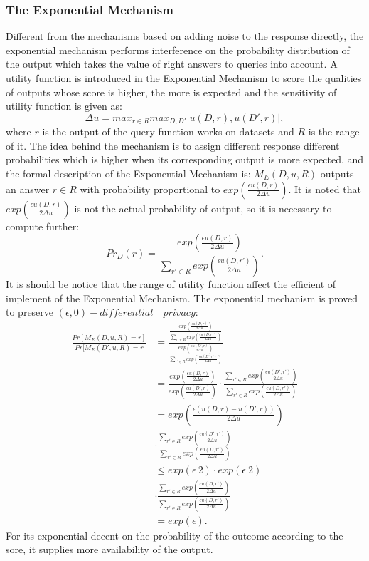 \documentclass[conference]{IEEEtran}
\begin{document}
\subsubsection{The Exponential Mechanism}
Different from the mechanisms based on adding noise to the response directly, the exponential mechanism performs interference on the probability distribution of the output which takes the value of right answers to queries into account. A utility function is introduced in the Exponential Mechanism to score the qualities of outputs whose score is higher, the more is expected and the sensitivity of utility function is given as:
\begin{equation}
    \Delta u = max_{r \in R} max_{D, D'}|u(D, r), u(D', r)|,
\end{equation}
where $r$ is the output of the query function works on datasets and $R$ is the range of it. The idea behind the mechanism is to assign different response different probabilities which is higher when its corresponding output is more expected, and the formal description of the Exponential Mechanism is: $M_E(D, u, R)$ outputs an answer $r \in R$ with probability proportional to $exp(\frac{\epsilon u(D,r)}{2\Delta u})$. It is noted that $exp(\frac{\epsilon u(D,r)}{2\Delta u})$ is not the actual probability of output, so it is necessary to compute further:
\begin{equation}
    Pr_D(r) = \frac{exp(\frac{\epsilon u(D,r)}{2\Delta u})}{\sum_{r' \in R}exp(\frac{\epsilon u(D,r')}{2\Delta u})}.
\end{equation}
It is should be notice that the range of utility function affect the efficient of implement of the Exponential Mechanism. The exponential mechanism is proved to preserve $(\epsilon, 0)-differential\quad privacy$:
\begin{equation}
    \begin{split}
        \frac{Pr[M_E(D, u, R) = r]}{Pr[M_E(D', u, R) = r} &= \frac{\frac{exp(\frac{\epsilon u(D,r)}{2\Delta u})}{\sum_{r' \in R}exp(\frac{\epsilon u(D,r')}{2\Delta u})}}{\frac{exp(\frac{\epsilon u(D',r)}{2\Delta u})}{\sum_{r' \in R}exp(\frac{\epsilon u(D',r')}{2\Delta u})}}\\
        &= \frac{exp(\frac{\epsilon u(D,r)}{2\Delta u})}{exp(\frac{\epsilon u(D',r)}{2\Delta u})} \cdot \frac{\sum_{r' \in R}exp(\frac{\epsilon u(D',r')}{2\Delta u})}{\sum_{r' \in R}exp(\frac{\epsilon u(D,r')}{2\Delta u})}\\
        &= exp(\frac{\epsilon(u(D,r)-u(D',r))}{2\Delta u})\\
        &\cdot \frac{\sum_{r' \in R}exp(\frac{\epsilon u(D',r')}{2\Delta u})}{\sum_{r' \in R}exp(\frac{\epsilon u(D,r')}{2\Delta u})}\\
        &\leq exp(\epsilon \ 2) \cdot exp(\epsilon \ 2) \\
        &\cdot \frac{\sum_{r' \in R}exp(\frac{\epsilon u(D,r')}{2\Delta u})}{\sum_{r' \in R}exp(\frac{\epsilon u(D,r')}{2\Delta u})}\\
        &= exp(\epsilon).
    \end{split}
\end{equation}
For its exponential decent on the probability of the outcome according to the sore, it supplies more availability of the output.
\end{document}
